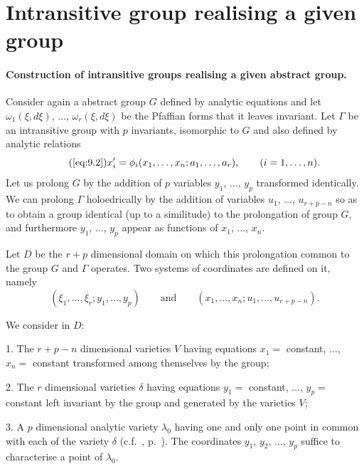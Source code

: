 \section{Intransitive group realising a given group}
\label{sec:intr-group-real}

\paragraph{Construction of intransitive groups realising a given abstract group.}
\label{sec:119}
Consider again a abstract group $G$ defined by analytic equations and let $\omega_{1}(\xi,d\xi)$, $\dots$, $\omega_{r}(\xi,d\xi)$ be the Pfaffian forms that it leaves invariant. Let $\Gamma$ be an intransitive group with $p$ invariants, isomorphic to $G$ and also defined by analytic relations
\begin{equation}
  \label{eq:9.2a}\tag{\ref{eq:9.2}}
  x'_{i}=\phi_{i}(x_{1},\dots,x_{n};a_{1},\dots,a_{r}),\qquad(i=1,\dots,n).
\end{equation}
Let us prolong $G$ by the addition of $p$ variables $y_{1}$, $\dots$, $y_{p}$ transformed identically. We can prolong $\Gamma$ holoedrically by the addition of variables $u_{1}$, $\dots$, $u_{r+p-n}$ so as to obtain a group identical (up to a similitude) to the prolongation of group $G$, and furthermore $y_{1}$, $\dots$, $y_{p}$ appear as functions of $x_{1}$, $\dots$, $x_{n}$.

Let $D$ be the $r+p$ dimensional domain on which this prolongation common to the group $G$ and $\Gamma$ operates. Two systems of coordinates are defined on it, namely
\[
(\xi_{1},\dots,\xi_{r};y_{1},\dots,y_{p})\qquad\text{and}\qquad(x_{1},\dots,x_{n};u_{1},\dots,u_{r+p-n}).
\]

We consider in $D$:

\somespace

1. The $r+p-n$ dimensional varieties $V$ having equations $x_{1}=$ constant, $\dots$, $x_{n}=$ constant transformed among themselves by the group;

2. The $r$ dimensional varieties $\delta$ having equations $y_{1}=$ constant, $\dots$, $y_{p}=$ constant left invariant by the group and generated by the varieties $V$;

3. A $p$ dimensional analytic variety $\lambda_{0}$ having one and only one point in common with each of the variety $\delta$ (c.f.~, p.~\pageref{sec:103}). The coordinates $y_{1}$, $y_{2}$, $\dots$, $y_{p}$ suffice to characterise a point of $\lambda_{0}$.

